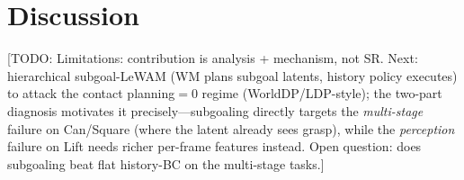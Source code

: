 \documentclass[11pt]{article}
\newcommand{\todo}[1]{{\color{red}[TODO: #1]}}
\begin{document}
\section{Discussion}
\todo{Limitations: contribution is analysis + mechanism, not SR. Next: hierarchical subgoal-LeWAM (WM plans subgoal latents, history policy executes) to attack the contact planning$=0$ regime (WorldDP/LDP-style); the two-part diagnosis motivates it precisely---subgoaling directly targets the \emph{multi-stage} failure on Can/Square (where the latent already sees grasp), while the \emph{perception} failure on Lift needs richer per-frame features instead. Open question: does subgoaling beat flat history-BC on the multi-stage tasks.}



\end{document}
